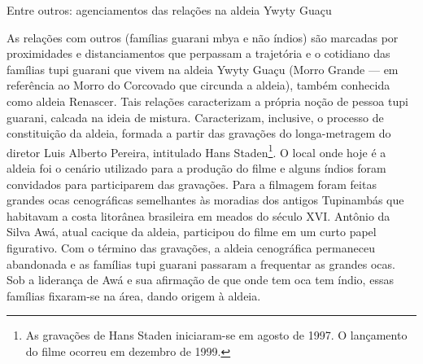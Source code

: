 \documentclass{article}
\begin{document}
Entre outros: agenciamentos das rela\c{c}\~oes na aldeia Ywyty Gua\c{c}u


As rela\c{c}\~oes com outros (fam\'ilias guarani mbya e n\~ao \'indios)
s\~ao marcadas por proximidades e distanciamentos que perpassam a
trajet\'oria e o cotidiano das fam\'ilias tupi guarani que vivem na
aldeia Ywyty Gua\c{c}u (Morro Grande --- em refer\^encia ao Morro do
Corcovado que circunda a aldeia), tamb\'em conhecida como aldeia
Renascer. Tais rela\c{c}\~oes caracterizam a pr\'opria no\c{c}\~ao de
pessoa tupi guarani, calcada na ideia de mistura. Caracterizam,
inclusive, o processo de constitui\c{c}\~ao da aldeia, formada a partir
das grava\c{c}\~oes do longa-metragem do diretor Luis Alberto Pereira,
intitulado Hans Staden\footnote{ As grava\c{c}\~oes de Hans Staden
iniciaram-se em agosto de 1997. O lan\c{c}amento do filme ocorreu em
dezembro de 1999.}. O local onde hoje \'e a aldeia foi o cen\'ario
utilizado para a produ\c{c}\~ao do filme e alguns \'indios foram
convidados para participarem das grava\c{c}\~oes. Para a filmagem foram
feitas grandes ocas cenogr\'aficas semelhantes \`as moradias dos
antigos Tupinamb\'as que habitavam a costa litor\^anea brasileira em
meados do s\'eculo XVI. Ant\^onio da Silva Aw\'a, atual cacique da
aldeia, participou do filme em um curto papel figurativo. Com o
t\'ermino das grava\c{c}\~oes, a aldeia cenogr\'afica permaneceu
abandonada e as fam\'ilias tupi guarani passaram a frequentar as
grandes ocas. Sob a lideran\c{c}a de Aw\'a e sua afirma\c{c}\~ao de que
onde tem oca tem \'indio, essas fam\'ilias fixaram-se na \'area, dando
origem \`a aldeia.
\end{document}
